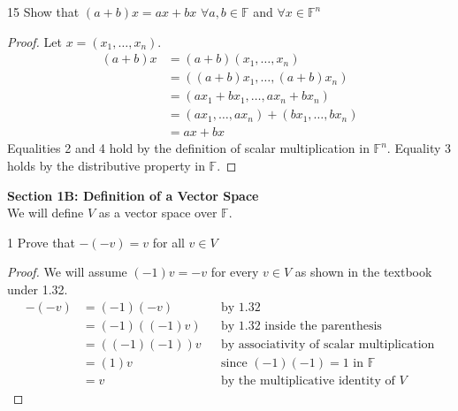 \documentclass[12pt]{article}
\newenvironment{problem}[1]{\begin{prob*}{#1}{}}{\end{prob*}}
\newcommand{\F}{\mathbb{F}}
\begin{document}
\begin{problem}{15}
Show that $(a+b)x=ax+bx$ $\forall a,b\in \mathbb{F}$ and $\forall x\in \mathbb{F}^n$
\end{problem}
\begin{proof}
    Let $x=(x_1,\ldots,x_n)$.
    \begin{align*}
        (a+b)x&=(a+b)(x_1,\ldots,x_n)\\
        &=((a+b)x_1,\ldots,(a+b)x_n)\\
        &=(ax_1+bx_1,\ldots,ax_n+bx_n)\\
        &=(ax_1,\ldots, ax_n)+(bx_1,\ldots,bx_n)\\
        &=ax+bx
    \end{align*}
    Equalities 2 and 4 hold by the definition of scalar multiplication in $\mathbb{F}^n$. Equality 3 holds by the distributive property in $\mathbb{F}$.
\end{proof}

\newpage

{\large \bfseries Section 1B: Definition of a Vector Space} \\
We will define $V$ as a vector space over $\F$.

\begin{problem}{1}
Prove that $-(-v)=v$ for all $v \in V$
\end{problem}
\begin{proof}
We will assume $(-1)v=-v$ for every $v \in V$ as shown in the textbook under 1.32.
\begin{align*}
-(-v) &= (-1)(-v) && \text{by 1.32} \\
      &= (-1)((-1)v) && \text{by 1.32 inside the parenthesis} \\
      &= ((-1)(-1))v && \text{by associativity of scalar multiplication} \\
      &= (1)v        && \text{since } (-1)(-1) = 1 \text{ in } \F \\
      &= v           && \text{by the multiplicative identity of } V
\end{align*}
\end{proof}
\end{document}
